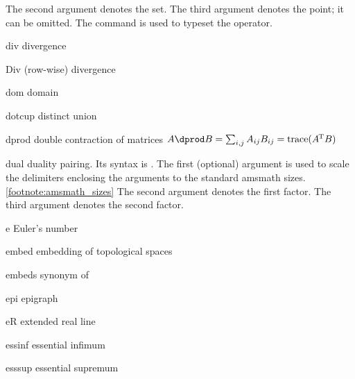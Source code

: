 \documentclass[english,a4paper,DIV=12,parskip=full,oneside]{scrartcl}
\begin{document}
\begin{commandlist}
            The second argument denotes the set.
            The third argument denotes the point; it can be omitted.
            The command \codeCommand{\distOp} is used to typeset the operator.
            \par{}
            \par\mathCodeExample{\dist{\cC}}
            \par\mathCodeExample{\dist}
        \item[div] divergence \mathCodeExample{\div}
        \item[Div] (row-wise) divergence \mathCodeExample{\Div}
        \item[dom] domain \mathCodeExample{\dom}
        \item[dotcup] distinct union \mathCodeExample{\dotcup}
        \item[dprod] double contraction of matrices $A \dprod B = \sum_{i,j} A_{ij} B_{ij} = \trace(A^\transp B)$
            \par{}
        \item[dual] duality pairing.
            Its syntax is .
            The first (optional) argument is used to scale the delimiters enclosing the arguments to the standard amsmath sizes.\cref{footnote:amsmath_sizes}
            The second argument denotes the first factor.
            The third argument denotes the second factor.
            \par{}
            \par{}
        \item[e] Euler's number \mathCodeExample{\e}
        \item[embed] embedding of topological spaces \mathCodeExample{\embed}
        \item[embeds] synonym of \codeCommand{\embed} \mathCodeExample{\embeds}
        \item[epi] epigraph \mathCodeExample{\epi}
        \item[eR] extended real line \mathCodeExample{\eR = \bbR \cup \{\pm \infty\}}
        \item[essinf] essential infimum \par {} %
        \item[esssup] essential supremum \par {} %

\end{commandlist}
\end{document}
